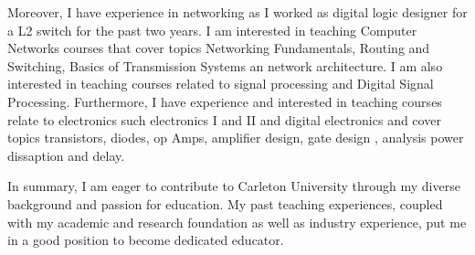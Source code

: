 Moreover, I have experience in networking as I worked as digital logic designer for a L2 switch for the past two years. I am interested in teaching Computer Networks courses that cover topics Networking Fundamentals, Routing and Switching, Basics of Transmission Systems an network architecture. I am also interested in teaching courses related to signal processing and  Digital Signal Processing. Furthermore, I have experience and interested  in teaching courses relate to electronics such electronics I and II and  digital electronics and cover topics transistors, diodes, op Amps, amplifier design, gate design , analysis power dissaption and delay. 

In summary,  I am eager to contribute to Carleton University through my diverse background and passion for education. My past teaching experiences, coupled with my  academic and research foundation as well as industry experience, put me in a good position to become dedicated  educator.











